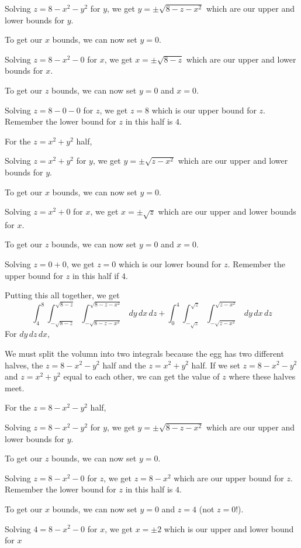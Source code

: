 \documentclass{article}
\begin{document}
Solving $z=8-x^2-y^2$ for $y$, we get $y=\pm \sqrt{8-z-x^2}$ which are our upper and lower bounds for $y$.

To get our $x$ bounds, we can now set $y=0$.

Solving $z=8-x^2-0$ for $x$, we get $x=\pm\sqrt{8-z}$ which are our upper and lower bounds for $x$.

To get our $z$ bounds, we can now set $y=0$ and $x=0$.

Solving $z=8-0-0$ for $z$, we get $z=8$ which is our upper bound for $z$. Remember the lower bound for $z$ in this half is $4$.

For the $z=x^2+y^2$ half,

Solving $z=x^2+y^2$ for $y$, we get $y=\pm\sqrt{z-x^2}$ which are our upper and lower bounds for $y$.

To get our $x$ bounds, we can now set $y=0$.

Solving $z=x^2+0$ for $x$, we get $x=\pm \sqrt{z}$ which are our upper and lower bounds for $x$.

To get our $z$ bounds, we can now set $y=0$ and $x=0$.

Solving $z=0+0$, we get $z=0$ which is our lower bound for $z$. Remember the upper bound for $z$ in this half if $4$.

Putting this all together, we get
\begin{equation*}
    \int_4^8\int_{-\sqrt{8-z}}^{\sqrt{8-z}}\int_{-\sqrt{8-z-x^2}}^{\sqrt{8-z-x^2}}\,dy\,dx\,dz+\int_0^4\int_{-\sqrt{z}}^{\sqrt{z}}\int_{-\sqrt{z-x^2}}^{\sqrt{z-x^2}}\,dy\,dx\,dz
\end{equation*}
For $dy\,dz\,dx$,

We must split the volumn into two integrals because the egg has two different halves, the $z=8-x^2-y^2$ half and the $z=x^2+y^2$ half. If we set $z=8-x^2-y^2$ and $z=x^2+y^2$ equal to each other, we can get the value of $z$ where these halves meet.

For the $z=8-x^2-y^2$ half,

Solving $z=8-x^2-y^2$ for $y$, we get $y=\pm \sqrt{8-z-x^2}$ which are our upper and lower bounds for $y$.

To get our $z$ bounds, we can now set $y=0$.

Solving $z=8-x^2-0$ for $z$, we get $z=8-x^2$ which are our upper bound for $z$. Remember the lower bound for $z$ in this half is $4$.

To get our $x$ bounds, we can now set $y=0$ and $z=4$ (not $z=0$!).

Solving $4=8-x^2-0$ for $x$, we get $x=\pm 2$ which is our upper and lower bound for $x$
\end{document}

